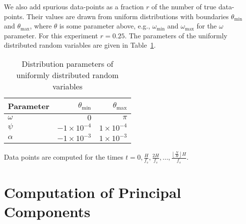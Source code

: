 We also add spurious data-points as a fraction $r$ of the number of true
data-points.  Their values are drawn from uniform distributions with boundaries
$\theta_{\text{min}}$ and $\theta_{\text{max}}$, where $\theta$ is some
parameter above, e.g., $\omega_{\text{min}}$ and $\omega_{\text{max}}$ for the
$\omega$ parameter. For this experiment $r = 0.25$. The parameters of the
uniformly distributed random variables are given in
Table~\ref{tab:amfmspuriousuniformparams}.
\begin{table}
    \caption{Distribution parameters of uniformly distributed random
    variables\label{tab:amfmspuriousuniformparams}}
    \begin{center}
        \begin{tabular}{l r r}
            Parameter & $\theta_{\text{min}}$ & $\theta_{\text{max}}$ \\
            \hline
            $\omega$  & $0$ & $\pi$ \\
            $\psi$    & $-1 \times 10^{-4}$ & $1 \times 10^{-4}$ \\
            $\alpha$  & $-1 \times 10^{-3}$ & $1 \times 10^{-3}$ \\
        \end{tabular}
    \end{center}
\end{table}
Data points are computed for the times $t = 0,\frac{H}{f_{s}},\frac{2
H}{f_{s}},\ldots,\frac{\left\lfloor \frac{N}{H} \right\rfloor H}{f_{s}}$.

\section{Computation of Principal Components}

